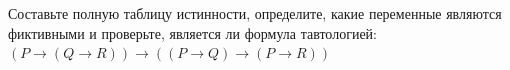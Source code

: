 \question Составьте полную таблицу истинности, определите, какие переменные являются фиктивными и проверьте, является ли формула тавтологией:
$(P \rightarrow (Q \rightarrow R)) \rightarrow ((P \rightarrow Q) \rightarrow (P \rightarrow R))$